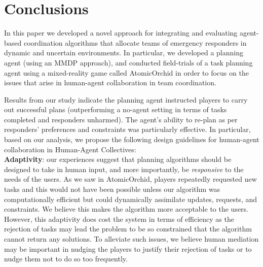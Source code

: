 \section{Conclusions}\label{sec:conclusions}
\noindent In this paper we developed a novel approach for integrating and evaluating agent-based coordination algorithms that allocate teams of emergency responders in dynamic and uncertain environments.  In particular, we developed a planning agent (using an MMDP approach), and conducted field-trials of a task planning agent using a mixed-reality game  called AtomicOrchid in order to focus on the issues that arise in human-agent collaboration in team coordination.

Results from our study indicate  the planning agent instructed players to carry out successful plans (outperforming a no-agent setting in terms of tasks completed and responders unharmed). The agent's ability to re-plan  as per responders' preferences and constraints was particularly effective. In particular, based on our analysis, we propose the following design guidelines for human-agent collaboration in Human-Agent Collectives:\\

\noindent \textbf{Adaptivity}: our experiences suggest that planning algorithms should be designed to take in human input, and more importantly, be \emph{responsive} to the needs of the users. As we saw in AtomicOrchid, players repeatedly requested new tasks and this would not have been possible unless our algorithm  was computationally efficient but could dynamically assimilate updates, requests, and constraints. We believe this makes the algorithm more acceptable to the users. However, this adaptivity does cost the system in terms of efficiency as the rejection of tasks may lead the problem to be so constrained that the algorithm cannot return any solutions. To alleviate such issues, we believe human mediation may be important in nudging the players to justify their rejection of tasks or to nudge them not to do so too frequently. \\


